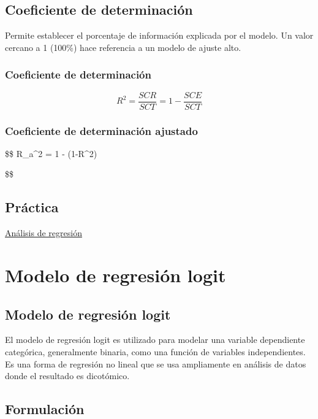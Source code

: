 \documentclass[
  letterpaper,
  DIV=11,
  numbers=noendperiod]{scrreprt}
\begin{document}
\section{Coeficiente de
determinación}\label{coeficiente-de-determinaciuxf3n}

Permite establecer el porcentaje de información explicada por el modelo.
Un valor cercano a 1 (100\%) hace referencia a un modelo de ajuste alto.

\subsection{Coeficiente de
determinación}\label{coeficiente-de-determinaciuxf3n-1}

\[
R^2 = \frac{SCR}{SCT} = 1- \frac{SCE}{SCT}
\]

\subsection{Coeficiente de determinación
ajustado}\label{coeficiente-de-determinaciuxf3n-ajustado}

\$\$ R\_a\^{}2 = 1 - (1-R\^{}2)

\$\$

\section{Práctica}\label{pruxe1ctica}

\href{https://seeing-theory.brown.edu/regression-analysis/}{Análisis de
regresión}


\chapter{Modelo de regresión logit}\label{modelo-de-regresiuxf3n-logit}

\section{Modelo de regresión
logit}\label{modelo-de-regresiuxf3n-logit-1}

El modelo de regresión logit es utilizado para modelar una variable
dependiente categórica, generalmente binaria, como una función de
variables independientes. Es una forma de regresión no lineal que se usa
ampliamente en análisis de datos donde el resultado es dicotómico.

\section{Formulación}\label{formulaciuxf3n-5}
\end{document}
